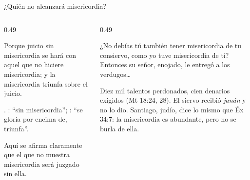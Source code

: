 \begin{frame}{¿Quién no alcanzará misericordia?}
\begin{columns}[t,onlytextwidth]
\begin{column}{0.49\textwidth}
\begin{cita}Porque juicio sin misericordia se hará con aquel que no hiciere misericordia; y la misericordia triunfa sobre el juicio.\end{cita}
\scriptsize{}. : ``sin misericordia''; : ``se gloría por encima de, triunfa''.\par\medskip
\small Aquí se afirma claramente que el que no muestra misericordia será juzgado sin ella.
\end{column}
\begin{column}{0.49\textwidth}
\begin{cita}¿No debías tú también tener misericordia de tu consiervo, como yo tuve misericordia de ti? Entonces su señor, enojado, le entregó a los verdugos\ldots{}\end{cita}
\scriptsize Diez mil talentos perdonados, cien denarios exigidos (Mt 18:24, 28). El siervo recibió \emph{janán} y no lo dio. Santiago, judío, dice lo mismo que Éx 34:7: la misericordia es abundante, pero no se burla de ella.\par\smallskip
{}
\end{column}
\end{columns}
\end{frame}

